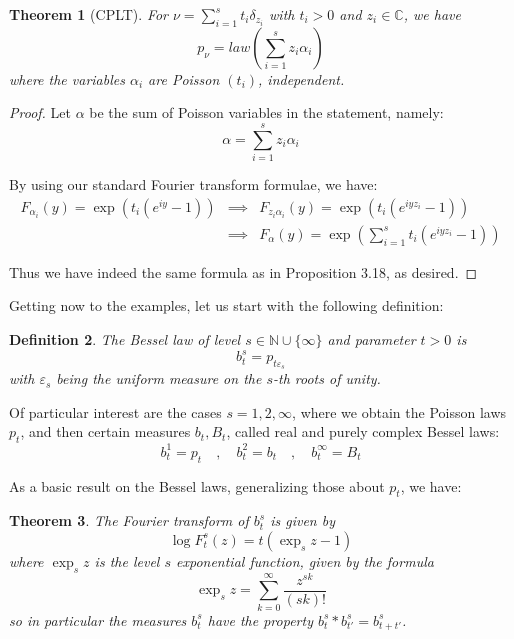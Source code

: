 \documentclass[12pt]{amsbook}
\newtheorem{theorem}{Theorem}[chapter]
\newtheorem{definition}[theorem]{Definition}
\begin{document}

\begin{theorem}[CPLT]
For $\nu=\sum_{i=1}^st_i\delta_{z_i}$ with $t_i>0$ and $z_i\in\mathbb C$, we have
$$p_\nu=law\left(\sum_{i=1}^sz_i\alpha_i\right)$$
where the variables $\alpha_i$ are Poisson $(t_i)$, independent.
\end{theorem}

\begin{proof}
Let $\alpha$ be the sum of Poisson variables in the statement, namely:
$$\alpha=\sum_{i=1}^sz_i\alpha_i$$

By using our standard Fourier transform formulae, we have:
\begin{eqnarray*}
F_{\alpha_i}(y)=\exp(t_i(e^{iy}-1))
&\implies&F_{z_i\alpha_i}(y)=\exp(t_i(e^{iyz_i}-1))\\
&\implies&F_\alpha(y)=\exp\left(\sum_{i=1}^st_i(e^{iyz_i}-1)\right)
\end{eqnarray*}

Thus we have indeed the same formula as in Proposition 3.18, as desired.
\end{proof}

Getting now to the examples, let us start with the following definition:


\begin{definition}
The Bessel law of level $s\in\mathbb N\cup\{\infty\}$ and parameter $t>0$ is
$$b_t^s=p_{t\varepsilon_s}$$
with $\varepsilon_s$ being the uniform measure on the $s$-th roots of unity.
\end{definition}

Of particular interest are the cases $s=1,2,\infty$, where we obtain the Poisson laws $p_t$, and then certain measures $b_t,B_t$, called real and purely complex Bessel laws:
$$b_t^1=p_t\quad,\quad b_t^2=b_t\quad,\quad b_t^\infty=B_t$$

As a basic result on the Bessel laws, generalizing those about $p_t$, we have:

\begin{theorem}
The Fourier transform of $b^s_t$ is given by
$$\log F^s_t(z)=t\left(\exp_sz-1\right)$$
where $\exp_sz$ is the level $s$ exponential function, given by the formula
$$\exp_sz=\sum_{k=0}^\infty\frac{z^{sk}}{(sk)!}$$
so in particular the measures $b^s_t$ have the property $b^s_t*b^s_{t'}=b^s_{t+t'}$.
\end{theorem}
\end{document}
